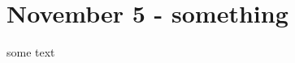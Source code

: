 \chapter{November 5 -\/ something}
\hypertarget{md_updates_2_november__5}{}\label{md_updates_2_november__5}
\label{md_updates_2_november__5_autotoc_md0}%
%
 some text 